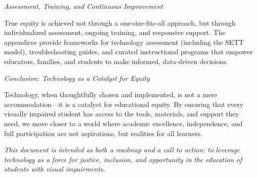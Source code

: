 \emph{Assessment, Training, and Continuous Improvement}

True equity is achieved not through a one-size-fits-all approach, but through individualized assessment, ongoing training, and responsive support. The appendices provide frameworks for technology assessment (including the SETT model), troubleshooting guides, and curated instructional programs that empower educators, families, and students to make informed, data-driven decisions.

\emph{Conclusion: Technology as a Catalyst for Equity}

Technology, when thoughtfully chosen and implemented, is not a mere accommodation—it is a catalyst for educational equity. By ensuring that every visually impaired student has access to the tools, materials, and support they need, we move closer to a world where academic excellence, independence, and full participation are not aspirations, but realities for all learners.

\bigskip

\noindent\textit{This document is intended as both a roadmap and a call to action: to leverage technology as a force for justice, inclusion, and opportunity in the education of students with visual impairments.}
